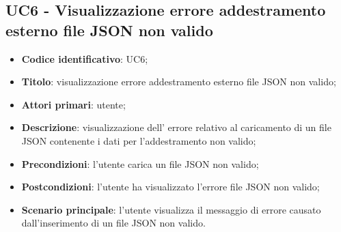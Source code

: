 \subsection{UC6 - Visualizzazione errore addestramento esterno file JSON non valido}
\begin{itemize}
	\item \textbf{Codice identificativo}: UC6;
	\item \textbf{Titolo}: visualizzazione errore addestramento esterno file JSON non valido;
	\item \textbf{Attori primari}: utente;
	\item \textbf{Descrizione}: visualizzazione dell' errore relativo al caricamento di un file JSON contenente i dati per l'addestramento non valido;
	\item \textbf{Precondizioni}: l'utente carica un file JSON non valido;
	\item \textbf{Postcondizioni}: l'utente ha visualizzato l'errore file JSON non valido;	
	\item \textbf{Scenario principale}: l'utente visualizza il messaggio di errore causato dall'inserimento di un file JSON non valido.	
\end{itemize}

